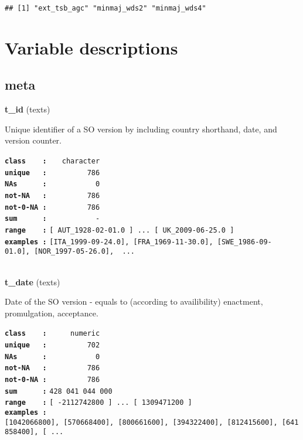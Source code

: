 \documentclass[]{article}
\begin{document}
\begin{verbatim}
## [1] "ext_tsb_agc" "minmaj_wds2" "minmaj_wds4"
\end{verbatim}

\section{Variable descriptions}\label{variable-descriptions}

\subsection{meta}\label{meta}

\textbf{t\_id} (texts)

Unique identifier of a SO version by including country shorthand, date,
and version counter.

\textbf{\texttt{class\ \ \ \ :}} \texttt{~~~character}\\
\textbf{\texttt{unique\ \ \ :}} \texttt{~~~~~~~~~786}\\
\textbf{\texttt{NAs\ \ \ \ \ \ :}} \texttt{~~~~~~~~~~~0}\\
\textbf{\texttt{not-NA\ \ \ :}} \texttt{~~~~~~~~~786}\\
\textbf{\texttt{not-0-NA\ :}} \texttt{~~~~~~~~~786}\\
\textbf{\texttt{sum\ \ \ \ \ \ :}} \texttt{~~~~~~~~~~~-}\\
\textbf{\texttt{range\ \ \ \ :}}
\texttt{{[}\ AUT\_1928-02-01.0\ {]}\ ...\ {[}\ UK\_2009-06-25.0\ {]}}\\
\textbf{\texttt{examples\ :}}
\texttt{{[}ITA\_1999-09-24.0{]},\ {[}FRA\_1969-11-30.0{]},\ {[}SWE\_1986-09-01.0{]},\ {[}NOR\_1997-05-26.0{]},\ \ ...}\\

~

\textbf{t\_date} (texts)

Date of the SO version - equals to (according to availibility)
enactment, promulgation, acceptance.

\textbf{\texttt{class\ \ \ \ :}} \texttt{~~~~~numeric}\\
\textbf{\texttt{unique\ \ \ :}} \texttt{~~~~~~~~~702}\\
\textbf{\texttt{NAs\ \ \ \ \ \ :}} \texttt{~~~~~~~~~~~0}\\
\textbf{\texttt{not-NA\ \ \ :}} \texttt{~~~~~~~~~786}\\
\textbf{\texttt{not-0-NA\ :}} \texttt{~~~~~~~~~786}\\
\textbf{\texttt{sum\ \ \ \ \ \ :}} \texttt{428~041~044~000}\\
\textbf{\texttt{range\ \ \ \ :}}
\texttt{{[}\ -2112742800\ {]}\ ...\ {[}\ 1309471200\ {]}}\\
\textbf{\texttt{examples\ :}}
\texttt{{[}1042066800{]},\ {[}570668400{]},\ {[}800661600{]},\ {[}394322400{]},\ {[}812415600{]},\ {[}641858400{]},\ {[}\ ...}\\
\end{document}
